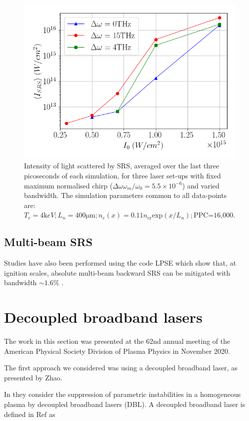 \begin{figure}[ht]
   \centering
    \includegraphics[width=0.75\columnwidth]{Chapters/C5_broadband/bandwidth_no_dependence_Wen.png}
    \caption{Intensity of light scattered by SRS, averaged over the last three picoseconds of each simulation, for three laser set-ups with fixed maximum normalised chirp ($\Delta\omega \omega_m / \omega_0=5.5\times10^{-6}$) and varied bandwidth. The simulation parameters common to all data-points are: $T_e = 4\si{\kilo eV}; L_n = 400\si{\micro\metre}; n_e(x) = 0.11n_{\text{cr}}\text{exp}(x/L_n);\text{PPC=16,000}. $}
    \label{fig:Wenreplication}
\end{figure}{}


\subsection{Multi-beam SRS}
Studies have also been performed using the code LPSE which show that, at ignition scales, absolute multi-beam backward SRS can be mitigated with bandwidth $\sim 1.6\%$ \citep{Follett2021}.

\section{Decoupled broadband lasers}

The work in this section was presented at the 62nd annual meeting of the American Physical Society Division of Plasma Physics in November 2020.
 
The first approach we considered was using a decoupled broadband laser, as presented by Zhao. 

In \cite{zhao_suppression_2019} they consider the suppression of parametric
instabilities in a homogeneous plasma by decoupled broadband lasers
(\acrshort{DBL}). A
decoupled broadband laser is defined in Ref \cite{Zhao2017b} as


